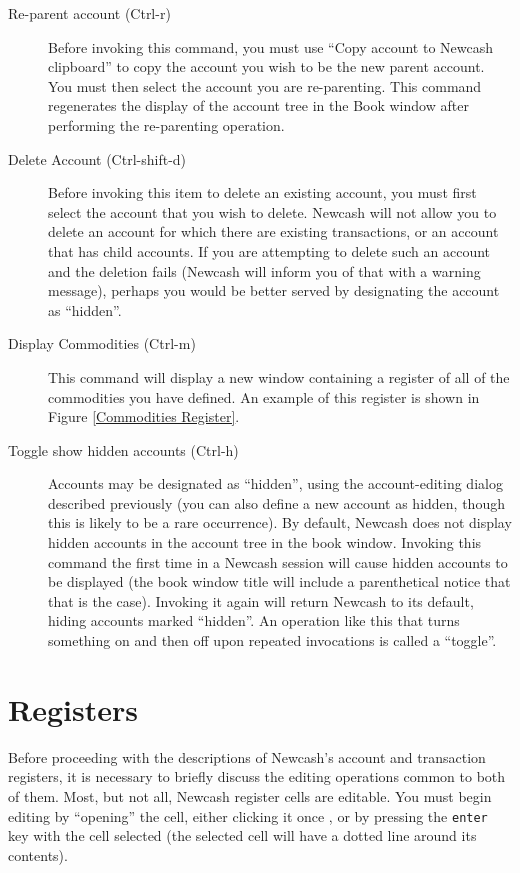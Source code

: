 \documentclass{report}
\begin{document}
\begin{description}
\item[Re-parent account (Ctrl-r)] Before invoking this command, you must use ``Copy account to Newcash clipboard'' to copy the account you wish to be the new parent account. You must then select the account you are re-parenting. This command regenerates the display of the account tree in the Book window after performing the re-parenting operation.
\item [Delete Account (Ctrl-shift-d)] Before invoking this item to delete an existing account, you must first select the account that you wish to delete. Newcash will not allow you to delete an account for which there are existing transactions, or an account that has child accounts. If you are attempting to delete such an account and the deletion fails (Newcash will inform you of that with a warning message), perhaps you would be better served by designating the account as ``hidden''.
\item [Display Commodities (Ctrl-m)] This command will display a new window containing a register of all of the commodities you have defined. An example of this register is shown in Figure \ref{Commodities Register}. 
\item [Toggle show hidden accounts (Ctrl-h)] Accounts may be designated as ``hidden'', using the account-editing dialog described previously (you can also define a new account as hidden, though this is likely to be a rare occurrence). By default, Newcash does not display hidden accounts in the account tree in the book window. Invoking this command the first time in a Newcash session will cause hidden accounts to be displayed (the book window title will include a parenthetical notice that that is the case). Invoking it again will return Newcash to its default, hiding accounts marked ``hidden''. An operation like this that turns something on and then off upon repeated invocations is called a ``toggle''.
\end{description}
\section{Registers}
\label{Registers}
Before proceeding with the descriptions of Newcash's account and transaction registers, it is necessary to briefly discuss the editing operations common to both of them. Most, but not all,  Newcash register cells are editable.  You must begin editing by ``opening'' the cell, either clicking it once , or by pressing the \verb|enter| key with the cell selected (the selected cell will have a dotted line around its contents).
\end{document}
